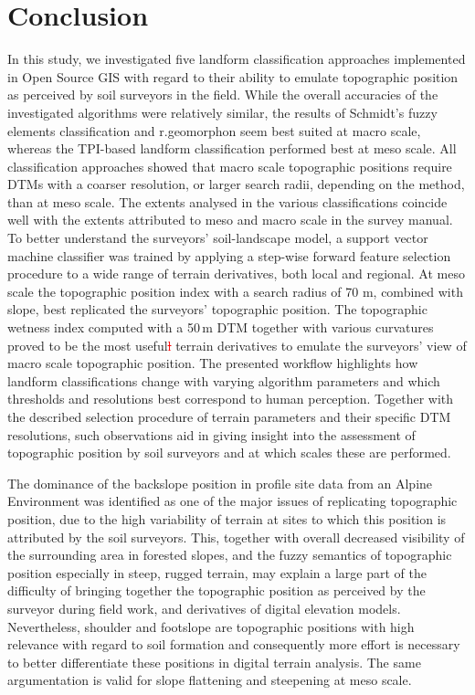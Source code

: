 \documentclass[preprint,12pt,authoryear]{elsarticle}
\begin{document}
\section{Conclusion}
In this study, we investigated five landform classification approaches implemented in Open Source GIS with regard to their ability to emulate topographic position as perceived by soil surveyors in the field. While the overall accuracies of the investigated algorithms were relatively similar, the results of Schmidt's fuzzy elements classification and r.geomorphon seem best suited at macro scale, whereas the TPI-based landform classification performed best at meso scale. All classification approaches showed that macro scale topographic positions require DTMs with a coarser resolution, or larger search radii, depending on the method, than at meso scale. The extents analysed in the various classifications coincide well with the extents attributed to meso and macro scale in the survey manual. To better understand the surveyors' soil-landscape model, a support  vector machine classifier was trained by applying a step-wise forward feature selection procedure to a wide range of terrain derivatives, both local and regional. At meso scale the topographic position index with a search radius of 70 m, combined with slope, best replicated the surveyors' topographic position. The topographic wetness index computed with a 50\,m DTM together with various curvatures proved to be the most useful\textcolor{red}{\sout{l}} terrain derivatives to emulate the surveyors' view of macro scale topographic position. The presented workflow highlights how landform classifications change with varying algorithm parameters and which thresholds and resolutions best correspond to human perception. Together with the described selection procedure of terrain parameters and their specific DTM resolutions, such observations aid in giving insight into the assessment of topographic position by soil surveyors and at which scales these are performed.
  
The dominance of the backslope position in profile site data from an Alpine Environment was identified as one of the major issues of replicating topographic position, due to the high variability of terrain at sites to which this position is attributed by the soil surveyors. This, together with overall decreased visibility of the surrounding area in forested slopes, and the fuzzy semantics of topographic position especially in steep, rugged terrain, may explain a large part of the difficulty of bringing together the topographic position as perceived by the surveyor during field work, and derivatives of digital elevation models. Nevertheless, shoulder and footslope are topographic positions with high relevance with regard to soil formation and consequently more effort is necessary to better differentiate these positions in digital terrain analysis. The same argumentation is valid for slope flattening and steepening at meso scale.
\end{document}
